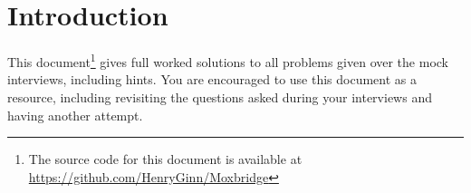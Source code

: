 \section*{Introduction}

This document\footnote{The source code for this document is available at \url{https://github.com/HenryGinn/Moxbridge}} gives full worked solutions to all problems given over the mock interviews, including hints. You are encouraged to use this document as a resource, including revisiting the questions asked during your interviews and having another attempt.